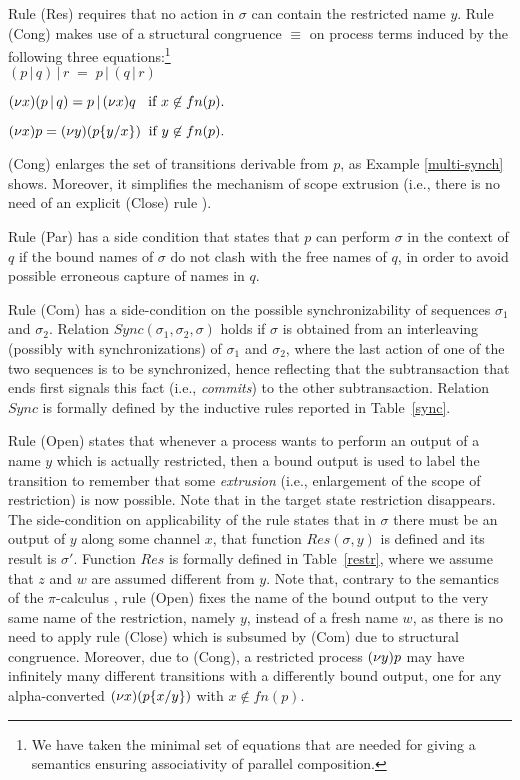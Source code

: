 \documentclass[submission,copyright,creativecommons]{eptcs}
\newcommand{\sost}[2]{\mbox{$\{#1/#2\}$}}
\newcommand{\restr}[1]{\mbox{$({\bf\nu} #1)$}}
\newcommand{\para}{\mbox{$\,|\,$}}
\begin{document}
Rule (Res) requires that no action in $\sigma$ can contain the restricted name $y$.
Rule (Cong) makes use of a structural congruence $\equiv$ on process terms induced by the 
following three equations:\footnote{We have taken the minimal set of equations that are needed
for giving a semantics ensuring associativity of parallel composition.}\\

$
(p \para q) \para r \; = \; p \para (q \para r)
$

$
\restr{x} (p \para q) = p \para \restr{x}q \; \; \mbox{ if $x \not\in fn(p)$}.
$

$
\restr{x} p =  \restr{y} (p\sost{y}{x})\; \;  \mbox{if $y \not\in fn(p)$}.\\
$

\noindent
(Cong) enlarges the set of transitions derivable from $p$, as Example \ref{multi-synch} shows. 
Moreover, it simplifies the mechanism of scope extrusion (i.e., there is no need of an explicit (Close) rule \cite{MPW}). 

Rule (Par) has a side condition 
that states that $p$ can perform $\sigma$ in the context of $q$ if the bound names of $\sigma$
do not clash with the free names of $q$, in order to avoid possible erroneous capture of names
in $q$. 

Rule (Com) has a side-condition on the possible
synchronizability of sequences $\sigma_1$ and $\sigma_2$. Relation $Sync(\sigma_1, \sigma_2, \sigma)$ holds
if $\sigma$ is obtained from an interleaving (possibly with synchronizations) of $\sigma_1$ and $\sigma_2$, 
where the last action of one of the two sequences is to be synchronized, hence reflecting that the 
subtransaction that ends first signals this fact (i.e., {\em commits}) to the other subtransaction.
Relation $Sync$ is formally defined by the inductive rules
reported in Table~\ref{sync}.

Rule (Open) states that whenever a
process wants to perform an output of a name $y$ which is actually restricted, then a bound
output is used to label the transition to remember that some {\em extrusion} (i.e., enlargement of
the scope of restriction) is now possible. Note that in the target state restriction disappears. 
The side-condition on applicability of the rule states 
that in $\sigma$ there must be an output of $y$ along some channel $x$, that function $Res(\sigma, y)$ is defined 
and its result is $\sigma'$.
Function $Res$ is formally defined in Table~\ref{restr}, where we assume that 
$z$ and $w$ are assumed different from $y$.
Note that, contrary to the semantics of the $\pi$-calculus \cite{MPW},
rule (Open) fixes the name of the bound output to the very same name of the restriction, namely $y$, instead of a fresh
name $w$, as there is no need to apply rule (Close) which is subsumed by (Com) due to structural congruence. Moreover,
due to (Cong), a restricted process $\restr{y}p$ may have infinitely many different transitions with a differently bound output,
one for any alpha-converted  $\restr{x} (p\sost{x}{y})$ with $x \not\in fn(p)$.
\end{document}
